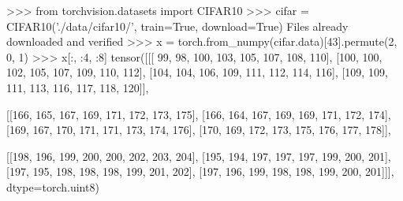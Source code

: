 \documentclass[c,8pt]{beamer}
\begin{document}
\begin{frame}[fragile]

\begin{rawsrc}
>>> from torchvision.datasets import CIFAR10
>>> cifar = CIFAR10('./data/cifar10/', train=True, download=True)
Files already downloaded and verified
>>> x = torch.from_numpy(cifar.data)[43].permute(2, 0, 1)
>>> x[:, :4, :8]
tensor([[[ 99,  98, 100, 103, 105, 107, 108, 110],
         [100, 100, 102, 105, 107, 109, 110, 112],
         [104, 104, 106, 109, 111, 112, 114, 116],
         [109, 109, 111, 113, 116, 117, 118, 120]],

        [[166, 165, 167, 169, 171, 172, 173, 175],
         [166, 164, 167, 169, 169, 171, 172, 174],
         [169, 167, 170, 171, 171, 173, 174, 176],
         [170, 169, 172, 173, 175, 176, 177, 178]],

        [[198, 196, 199, 200, 200, 202, 203, 204],
         [195, 194, 197, 197, 197, 199, 200, 201],
         [197, 195, 198, 198, 198, 199, 201, 202],
         [197, 196, 199, 198, 198, 199, 200, 201]]], dtype=torch.uint8)
\end{rawsrc}



\end{frame}

\end{document}
